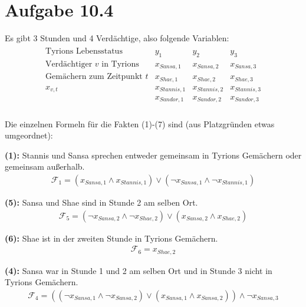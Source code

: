 \documentclass{article}
\begin{document}
\section*{Aufgabe 10.4}
Es gibt 3 Stunden und 4 Verdächtige, also folgende Variablen:
\begin{align*}
\begin{array}{l|lll}
\text{Tyrions Lebensstatus} & y_1 & y_2 & y_3 \\
\hline
\text{Verdächtiger $v$ in Tyrions} & x_{Sansa,1} & x_{Sansa,2} & x_{Sansa,3} \\ 
\text{Gemächern zum Zeitpunkt $t$} & x_{Shae,1} & x_{Shae,2} & x_{Shae,3} \\
x_{v,t}                            & x_{Stannis,1} & x_{Stannis,2} & x_{Stannis,3} \\
                                   & x_{Sandor,1} & x_{Sandor,2} & x_{Sandor,3} \\
\end{array}
\end{align*}

Die einzelnen Formeln für die Fakten (1)-(7) sind (aus Platzgründen etwas umgeordnet):

\smallskip

\textbf{(1): }Stannis und Sansa sprechen entweder gemeinsam in Tyrions Gemächern oder gemeinsam außerhalb.
\begin{align*}
\mathcal{F}_{1}=(x_{Sansa,1} \wedge x_{Stannis,1}) \vee (\neg x_{Sansa,1} \wedge \neg x_{Stannis,1})
\end{align*}

\textbf{(5): }Sansa und Shae sind in Stunde 2 am selben Ort.
\begin{align*}
\mathcal{F}_5 = \left( \neg x_{Sansa,2} \wedge \neg x_{Shae,2} \right) \vee \left( x_{Sansa,2} \wedge x_{Shae,2} \right)
\end{align*}

\textbf{(6): }Shae ist in der zweiten Stunde in Tyrions Gemächern.
\begin{align*}
\mathcal{F}_6 = x_{Shae,2}
\end{align*}

\textbf{(4): }Sansa war in Stunde 1 und 2 am selben Ort und in Stunde 3 nicht in Tyrions Gemächern.
\begin{align*}
\mathcal{F}_4 = \left( \left( \neg x_{Sansa,1} \wedge \neg x_{Sansa,2} \right) \vee \left( x_{Sansa,1} \wedge x_{Sansa,2} \right) \right) \wedge \neg x_{Sansa,3}
\end{align*}
\end{document}

